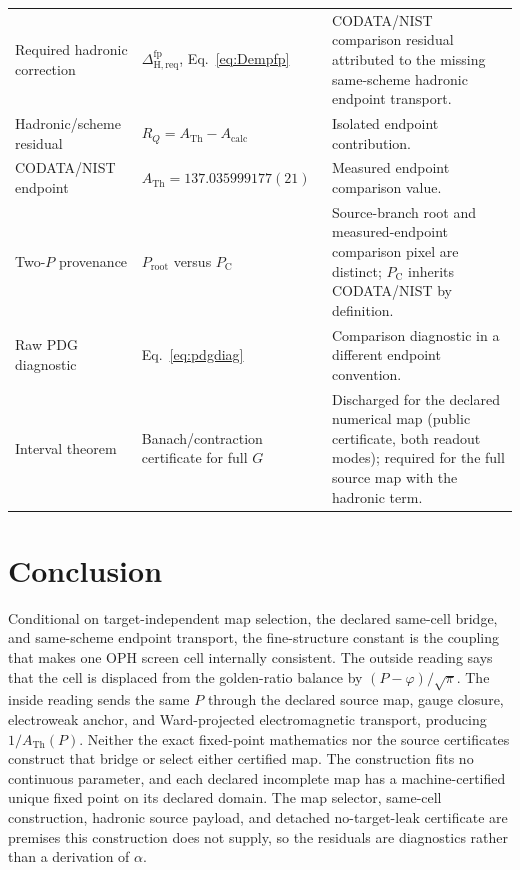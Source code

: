 \documentclass[11pt]{article}
\theoremstyle{remark}
\newcommand{\ATh}{A_{\mathrm{Th}}}
\newcommand{\Ppub}{P_{\mathrm C}}
\newcommand{\Rq}{R_Q}
\newcommand{\Dhadreq}{\Delta_{\mathrm{H,req}}}
\begin{document}
\begin{longtable}{@{}L{0.18\textwidth}L{0.44\textwidth}L{0.28\textwidth}@{}}
Required hadronic correction & \(\Dhadreq^{\mathrm{fp}}\), Eq.~\eqref{eq:Dempfp} & CODATA/NIST comparison residual attributed to the missing same-scheme hadronic endpoint transport. \\
Hadronic/scheme residual & \(\Rq=\ATh-A_{\mathrm{calc}}\) & Isolated endpoint contribution. \\
CODATA/NIST endpoint & \(\ATh=137.035999177(21)\) & Measured endpoint comparison value. \\
Two-\(P\) provenance & \(P_{\mathrm{root}}\) versus \(\Ppub\) & Source-branch root and measured-endpoint comparison pixel are distinct; \(\Ppub\) inherits CODATA/NIST by definition. \\
Raw PDG diagnostic & Eq.~\eqref{eq:pdgdiag} & Comparison diagnostic in a different endpoint convention. \\
Interval theorem & Banach/contraction certificate for full \(G\) & Discharged for the declared numerical map (public certificate, both readout modes); required for the full source map with the hadronic term. \\
\bottomrule
\end{longtable}

\section{Conclusion}

Conditional on target-independent map selection, the declared same-cell
bridge, and same-scheme endpoint transport, the fine-structure constant is
the coupling that makes one OPH screen cell internally consistent. The outside
reading says that the cell is displaced from the golden-ratio balance by
\((P-\varphi)/\sqrt\pi\). The inside reading sends the same \(P\) through the
declared source map, gauge closure, electroweak anchor, and Ward-projected
electromagnetic transport, producing \(1/\ATh(P)\). Neither the exact
fixed-point mathematics nor the source certificates construct that bridge or
select either certified map. The
construction fits no continuous parameter, and each declared incomplete map
has a machine-certified unique fixed point on its declared domain. The
map selector, same-cell construction, hadronic source payload, and detached
no-target-leak certificate are premises this construction does not supply, so
the residuals are diagnostics rather than a derivation of \(\alpha\).
\end{document}
